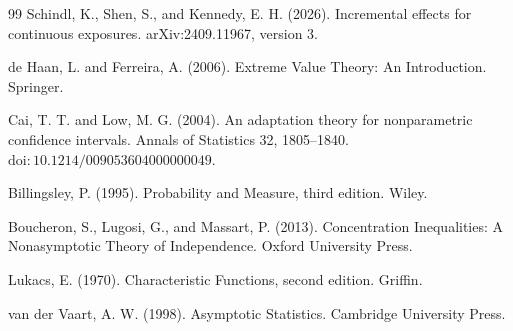 \documentclass{article}
\begin{document}
\begin{thebibliography}{99}
   Schindl, K., Shen, S., and Kennedy, E. H. (2026). Incremental effects for continuous exposures. arXiv:2409.11967, version 3.

   de Haan, L. and Ferreira, A. (2006). Extreme Value Theory: An Introduction. Springer.

   Cai, T. T. and Low, M. G. (2004). An adaptation theory for nonparametric confidence intervals. Annals of Statistics 32, 1805--1840. \(\mathrm{doi}:10.1214/009053604000000049\).

   Billingsley, P. (1995). Probability and Measure, third edition. Wiley.

   Boucheron, S., Lugosi, G., and Massart, P. (2013). Concentration Inequalities: A Nonasymptotic Theory of Independence. Oxford University Press.

   Lukacs, E. (1970). Characteristic Functions, second edition. Griffin.

   van der Vaart, A. W. (1998). Asymptotic Statistics. Cambridge University Press.

\end{thebibliography}
\end{document}
